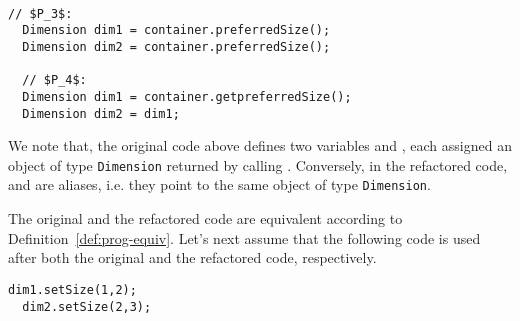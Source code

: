 \documentclass[sigconf,review,anonymous]{acmart}
\begin{document}
\begin{example}\label{ex:aliasing}
~\begin{lstlisting}[mathescape=true,showstringspaces=false]
  // $P_3$:
  Dimension dim1 = container.preferredSize();
  Dimension dim2 = container.preferredSize();    

  // $P_4$:
  Dimension dim1 = container.getpreferredSize();  
  Dimension dim2 = dim1;
\end{lstlisting}



    




We note that, the original code above defines two variables  and
, each assigned an object of type \texttt{Dimension} returned by calling
.
Conversely, in the refactored code,  and  are aliases, i.e. they point to the same
object of type \texttt{Dimension}.

The original and the refactored code are equivalent according to Definition~\ref{def:prog-equiv}.
Let's next assume that the following code
is used after both the original and the refactored code, respectively.

\begin{lstlisting}[mathescape=true,showstringspaces=false]
  dim1.setSize(1,2);
  dim2.setSize(2,3);  
\end{lstlisting}


\end{example}
\end{document}

